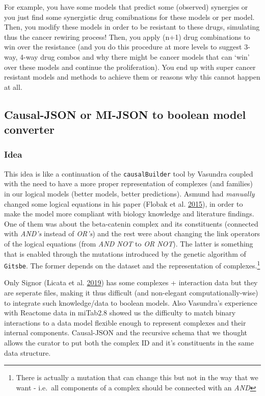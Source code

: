\documentclass[
  12pt,
]{book}
\begin{document}
For example, you have some models that predict some (observed) synergies or you
just find some synergistic drug comibnations for these models or per model.
Then, you modify these models in order to be resistant to these drugs, simulating
thus the cancer rewiring process! Then, you apply (n+1) drug combinations to
win over the resistance (and you do this procedure at more levels to suggest
3-way, 4-way drug combos and why there might be cancer models that can `win'
over these models and continue the proliferation). You end up with super cancer
resistant models and methods to achieve them or reasons why this cannot happen
at all.

\hypertarget{causal-json-or-mi-json-to-boolean-model-converter}{%
\subsection*{Causal-JSON or MI-JSON to boolean model converter}\label{causal-json-or-mi-json-to-boolean-model-converter}}

\hypertarget{idea-3}{%
\subsubsection*{Idea}\label{idea-3}}

This idea is like a continuation of the \texttt{causalBuilder} tool by Vasundra coupled with the need to have a more proper representation of complexes (and families) in our logical models (better models, better predictions).
Asmund had \emph{manually} changed some logical equations in his paper (Flobak et al. \protect\hyperlink{ref-Flobak2015}{2015}), in order to make the model more compliant with biology knowledge and literature findings.
One of them was about the beta-catenin complex and its constituents (connected with \emph{AND's} instead of \emph{OR's}) and the rest were about changing the link operators of the logical equations (from \emph{AND NOT} to \emph{OR NOT}).
The latter is something that is enabled through the mutations introduced by the genetic algorithm of \texttt{Gitsbe}.
The former depends on the dataset and the representation of complexes.\footnote{There is actually a mutation that can change this but not in the way that we want - i.e.~all components of a complex should be connected with an \emph{AND}}

Only Signor (Licata et al. \protect\hyperlink{ref-Licata2019}{2019}) has some complexes + interaction data but they are seperate files, making it thus difficult (and non-elegant computationally-wise) to integrate such knowledge/data to boolean models.
Also Vasundra's experience with Reactome data in miTab2.8 showed us the difficulty to match binary interactions to a data model flexible enough to represent complexes and their internal components. Causal-JSON and the recursive schema that we thought allows the curator to put both the complex ID and it's constituents in the same data structure.
\end{document}
